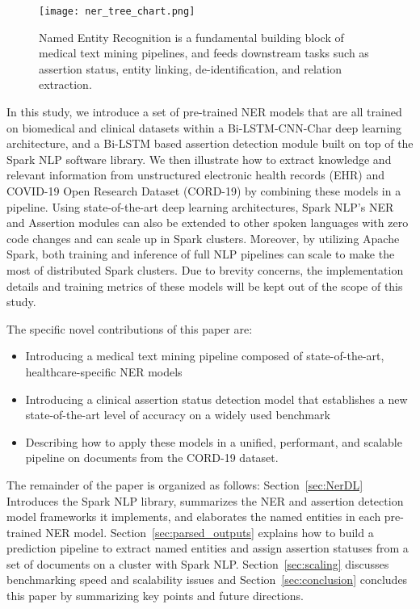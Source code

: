 \documentclass[letterpaper]{article} \usepackage{aaai21}  \usepackage{times}  \usepackage{helvet} \usepackage{courier}  \usepackage[hyphens]{url}  \usepackage{graphicx} \urlstyle{rm} \def\UrlFont{\rm}  \usepackage{natbib}  \usepackage{caption} \frenchspacing  \setlength{\pdfpagewidth}{8.5in}  \setlength{\pdfpageheight}{11in}  \usepackage{lscape}
\begin{document}
\begin{figure*}[htb!]
\texttt{[image: ner\_tree\_chart.png]}
\centering
\caption{Named Entity Recognition is a fundamental building block of medical text mining pipelines, and feeds downstream tasks such as assertion status, entity linking, de-identification, and relation extraction.}
\label{fig:ner_tree_chart}
\end{figure*}

In this study, we introduce a set of pre-trained NER models that are all trained on biomedical and clinical datasets within a Bi-LSTM-CNN-Char deep learning architecture, and a Bi-LSTM based assertion detection module built on top of the Spark NLP software library. We then illustrate how to extract knowledge and relevant information from unstructured electronic health records (EHR) and COVID-19 Open Research Dataset (CORD-19) by combining these models in a pipeline. Using state-of-the-art deep learning architectures, Spark NLP's NER and Assertion modules can also be extended to other spoken languages with zero code changes and can scale up in Spark clusters. Moreover, by utilizing Apache Spark, both training and inference of full NLP pipelines can scale to make the most of distributed Spark clusters. Due to brevity concerns, the implementation details and training metrics of these models will be kept out of the scope of this study.

The specific novel contributions of this paper are:
\begin{itemize}

\item Introducing a medical text mining pipeline composed of state-of-the-art, healthcare-specific NER models

\item Introducing a clinical assertion status detection model that establishes a new state-of-the-art level of accuracy on a widely used benchmark

\item Describing how to apply these models in a unified, performant, and scalable pipeline on documents from the CORD-19 dataset.

\end{itemize}

The remainder of the paper is organized as follows: 
Section~\ref{sec:NerDL} Introduces the Spark NLP library, summarizes the NER and assertion detection model frameworks it implements, and elaborates the named entities in each pre-trained NER model.
Section~\ref{sec:parsed_outputs} explains how to build a prediction pipeline to extract named entities and assign assertion statuses from a set of documents on a cluster with Spark NLP.
Section~\ref{sec:scaling} discusses benchmarking speed and scalability issues and
Section~\ref{sec:conclusion}  concludes this paper by summarizing key points and future directions.
\end{document}
